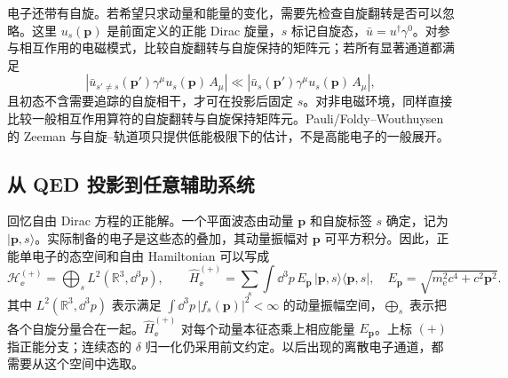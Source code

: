 电子还带有自旋。若希望只求动量和能量的变化，需要先检查自旋翻转是否可以忽略。这里 $u_s(\mathbf p)$ 是前面定义的正能 Dirac 旋量，$s$ 标记自旋态，$\bar u=u^\dagger\gamma^0$。对参与相互作用的电磁模式，比较自旋翻转与自旋保持的矩阵元；若所有显著通道都满足
\begin{equation*}
\left|\bar u_{s'\neq s}(\mathbf p')\gamma^\mu u_s(\mathbf p)\,A_\mu\right|
\ll
\left|\bar u_s(\mathbf p')\gamma^\mu u_s(\mathbf p)\,A_\mu\right|,
\end{equation*}
且初态不含需要追踪的自旋相干，才可在投影后固定 $s$。对非电磁环境，同样直接比较一般相互作用算符的自旋翻转与自旋保持矩阵元。Pauli/Foldy--Wouthuysen 的 Zeeman 与自旋--轨道项只提供低能极限下的估计，不是高能电子的一般展开。



\subsection{从 QED 投影到任意辅助系统}

回忆自由 Dirac 方程的正能解。一个平面波态由动量 $\mathbf p$ 和自旋标签 $s$ 确定，记为 $|\mathbf p,s\rangle$。实际制备的电子是这些态的叠加，其动量振幅对 $\mathbf p$ 可平方积分。因此，正能单电子的态空间和自由 Hamiltonian 可以写成
\begin{equation}
\boxed{
\mathcal H_\ee^{(+)}
=\bigoplus_s L^2(\mathbb R^3,\dd^3p),
\qquad
\hat H_\ee^{(+)}
=\sum_s\int\dd^3p\,
E_{\mathbf p}\,|\mathbf p,s\rangle\langle\mathbf p,s|,
\quad
E_{\mathbf p}=\sqrt{m_{\mathrm e}^2c^4+c^2\mathbf p^2}.}
\label{eq:free_electron_positive_continuum_mother}
\end{equation}
其中 $L^2(\mathbb R^3,\dd^3p)$ 表示满足 $\int\dd^3p\,|f_s(\mathbf p)|^2<\infty$ 的动量振幅空间，$\bigoplus_s$ 表示把各个自旋分量合在一起。$\hat H_\ee^{(+)}$ 对每个动量本征态乘上相应能量 $E_{\mathbf p}$。上标 $(+)$ 指正能分支；连续态的 $\delta$ 归一化仍采用前文约定。以后出现的离散电子通道，都需要从这个空间中选取。

